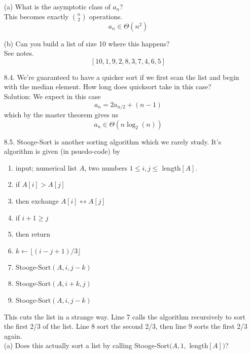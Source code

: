 \documentclass[16 pt]{amsart}
\theoremstyle{definition}
\theoremstyle{remark}
\numberwithin{equation}{subsection}
\begin{document}
(a) What is the asymptotic class of $a_n$?\\

This becomes exactly $\binom{n}{2}$ operations.
\[
a_n \in \Theta(n^2)
\]


(b) Can you build a list of size 10 where this happens?\\
See notes.\\
\[
[10,1,9,2,8,3,7,4,6,5]
\]


8.4.  We're guaranteed to have a quicker sort if we first scan the list and begin with the median element.  How long does quicksort take in this case?\\


Solution:  We expect in this case
\[
a_n = 2a_{n/2} + (n-1)
\]
which by the master theorem gives us
\[
a_n \in \Theta(n\log_2(n))
\]




8.5.  Stooge-Sort is another sorting algorithm which we rarely study.  It's algorithm is given (in psuedo-code) by

\begin{enumerate}
\item input; numerical list $A$, two numbers $1\le i,j \le $ length$[A]$.\\
\item if $A[i]>A[j]$\\
\item then exchange $A[i]\leftrightarrow A[j]$\\
\item if $i+1\ge j$\\
\item then return\\
\item $k \leftarrow \lfloor (i-j+1)/3\rfloor$\\
\item Stooge-Sort$(A,i,j-k)$\\
\item Stooge-Sort$(A,i+k,j)$\\
\item Stooge-Sort$(A,i,j-k)$\\
\end{enumerate}

This cuts the list in a strange way.   Line 7 calls the algorithm recursively to sort the first 2/3 of the list.  Line 8 sort the second 2/3, then line 9 sorts the first 2/3 again.\\

(a) Does this actually sort a list by calling Stooge-Sort$(A,1,$ length$[A])$?\\
\end{document}
